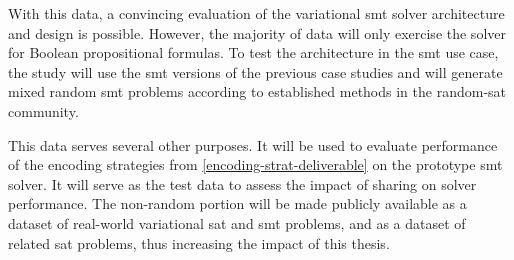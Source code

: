 With this data, a convincing evaluation of the variational \ac{smt} solver
architecture and design is possible. However, the majority of data will only
exercise the solver for Boolean propositional formulas. To test the architecture
in the \ac{smt} use case, the study will use the \ac{smt} versions of the
previous case studies and will generate mixed\cite{Gent94thesat} random \ac{smt}
problems according to established methods in the random-\ac{sat} community.

This data serves several other purposes. It will be used to evaluate performance
of the encoding strategies from \autoref{encoding-strat-deliverable} on the
prototype \ac{smt} solver. It will serve as the test data to assess the impact
of sharing on solver performance. The non-random portion will be made publicly
available as a dataset of real-world variational \ac{sat} and \ac{smt} problems,
and as a dataset of related \ac{sat} problems, thus increasing the impact of
this thesis.

